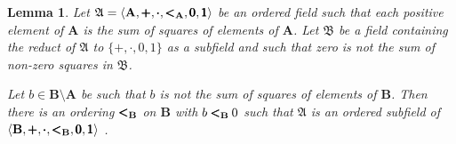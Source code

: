 \documentclass[titlepage, oneside]{amsbook}
\theoremstyle{plain}
\newtheorem{lemma}{Lemma}
\theoremstyle{definition}
\theoremstyle{remark}
\newcommand{\ma}{\ensuremath{\mathfrak{A}}}
\newcommand{\mb}{\ensuremath{\mathfrak{B}}}
\newcommand{\ba}{\ensuremath{\mathbf{A}}}
\newcommand{\bb}{\ensuremath{\mathbf{B}}}
\begin{document}
\begin{lemma}\label{L:sum} Let $\ma = \langle \ba, \pmb{+}, \pmb{\cdot}
, \pmb{<}\negthickspace_\ba ,\pmb{ 0}, \pmb{1 }
\rangle$ be an ordered field such that each positive element of $\ba$
is the sum of squares of elements of $\ba$. Let $\mb$ be a field
containing the reduct of 
$\ma$ to $\{ + , \cdot , 0, 1 \}$ as a subfield and such that zero is not 
the sum of non-zero squares in $\mb$.

Let $b \in \bb \setminus \ba $ be such that $b$ is not the sum of
squares of elements of $\bb$. Then there is an ordering 
$\pmb{<}\negthickspace_ \bb$  on $\bb$ with $b \pmb{<}\negthickspace_\bb \:0$
such that $\ma $ is an ordered subfield of $ \langle \bb, \pmb{+}, \pmb{\cdot}
, \pmb{<}\negthickspace_\bb ,\pmb{ 0}, \pmb{1 } \rangle$ .
\end{lemma}
\end{document}
